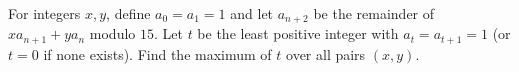 For integers $x,y$, define $a_0=a_1=1$ and let $a_{n+2}$ be the remainder of $xa_{n+1}+ya_n$ modulo $15$. Let $t$ be the least positive integer with $a_t=a_{t+1}=1$ (or $t=0$ if none exists). Find the maximum of $t$ over all pairs $(x,y)$.
